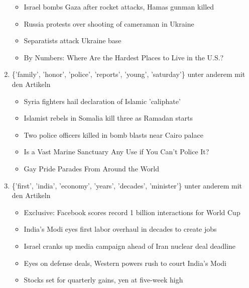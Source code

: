 \documentclass[12pt,a4paper]{scrartcl}
\begin{document}
\begin{enumerate}
{\begin{itemize}
	\item{Israel bombs Gaza after rocket attacks, Hamas gunman killed}
	\item{Russia protests over shooting of cameraman in Ukraine}
	\item{Separatists attack Ukraine base}
	\item{By Numbers: Where Are the Hardest Places to Live in the U.S.?}
	\end{itemize}}
\item{\{'family', 'honor', 'police', 'reports', 'young', 'saturday'\} unter anderem mit den Artikeln
	\begin{itemize}
	\item{Syria fighters hail declaration of Islamic 'caliphate'}
	\item{Islamist rebels in Somalia kill three as Ramadan starts}
	\item{Two police officers killed in bomb blasts near Cairo palace}
	\item{Is a Vast Marine Sanctuary Any Use if You Can’t Police It?}
	\item{Gay Pride Parades From Around the World}
	\end{itemize}}
\item{\{'first', 'india', 'economy', 'years', 'decades', 'minister'\} unter anderem mit den Artikeln
	\begin{itemize}
	\item{Exclusive: Facebook scores record 1 billion interactions for World Cup}
	\item{India's Modi eyes first labor overhaul in decades to create jobs}
	\item{Israel cranks up media campaign ahead of Iran nuclear deal deadline}
	\item{Eyes on defense deals, Western powers rush to court India's Modi}
	\item{Stocks set for quarterly gains, yen at five-week high}
	\end{itemize}}
\end{enumerate}
\end{document}
